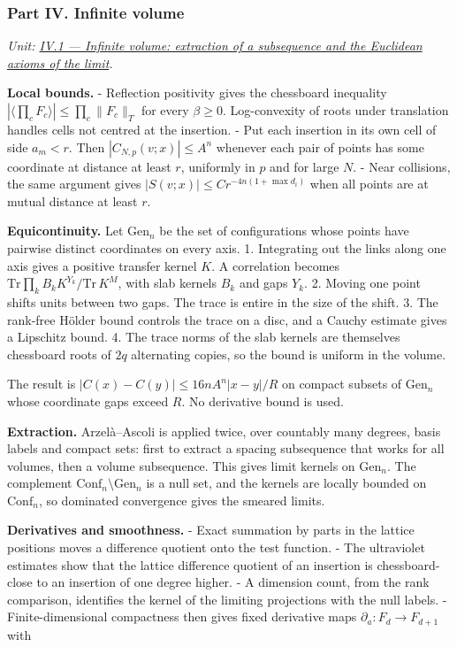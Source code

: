 \documentclass[
  letterpaper,
  11pt]{article}
\begin{document}
\subsubsection{Part IV. Infinite volume}\label{part-iv.-infinite-volume}

\emph{Unit:
\href{https://github.com/scottnarmstrong/yang-mills-informalization/blob/main/outline/units/IV-1.md}{IV.1
--- Infinite volume: extraction of a subsequence and the Euclidean
axioms of the limit}.}

\textbf{Local bounds.} - Reflection positivity gives the chessboard
inequality \(|\langle\prod_cF_c\rangle|\le\prod_c\lVert F_c\rVert_T\)
for every \(\beta\ge0\). Log-convexity of roots under translation
handles cells not centred at the insertion. - Put each insertion in its
own cell of side \(a_m<r\). Then \(|C_{N,p}(v;x)|\le A^n\) whenever each
pair of points has some coordinate at distance at least \(r\), uniformly
in \(p\) and for large \(N\). - Near collisions, the same argument gives
\(|S(v;x)|\le Cr^{-4n(1+\max d_i)}\) when all points are at mutual
distance at least \(r\).

\textbf{Equicontinuity.} Let \(\mathrm{Gen}_n\) be the set of
configurations whose points have pairwise distinct coordinates on every
axis. 1. Integrating out the links along one axis gives a positive
transfer kernel \(K\). A correlation becomes
\(\mathrm{Tr}\prod_kB_kK^{Y_k}/\mathrm{Tr}\,K^M\), with slab kernels
\(B_k\) and gaps \(Y_k\). 2. Moving one point shifts units between two
gaps. The trace is entire in the size of the shift. 3. The rank-free
Hölder bound controls the trace on a disc, and a Cauchy estimate gives a
Lipschitz bound. 4. The trace norms of the slab kernels are themselves
chessboard roots of \(2q\) alternating copies, so the bound is uniform
in the volume.

The result is \(|C(x)-C(y)|\le16nA^n|x-y|/R\) on compact subsets of
\(\mathrm{Gen}_n\) whose coordinate gaps exceed \(R\). No derivative
bound is used.

\textbf{Extraction.} Arzelà--Ascoli is applied twice, over countably
many degrees, basis labels and compact sets: first to extract a spacing
subsequence that works for all volumes, then a volume subsequence. This
gives limit kernels on \(\mathrm{Gen}_n\). The complement
\(\mathrm{Conf}_n\setminus\mathrm{Gen}_n\) is a null set, and the
kernels are locally bounded on \(\mathrm{Conf}_n\), so dominated
convergence gives the smeared limits.

\textbf{Derivatives and smoothness.} - Exact summation by parts in the
lattice positions moves a difference quotient onto the test function. -
The ultraviolet estimates show that the lattice difference quotient of
an insertion is chessboard-close to an insertion of one degree higher. -
A dimension count, from the rank comparison, identifies the kernel of
the limiting projections with the null labels. - Finite-dimensional
compactness then gives fixed derivative maps
\(\partial_a:F_d\to F_{d+1}\) with
\end{document}
